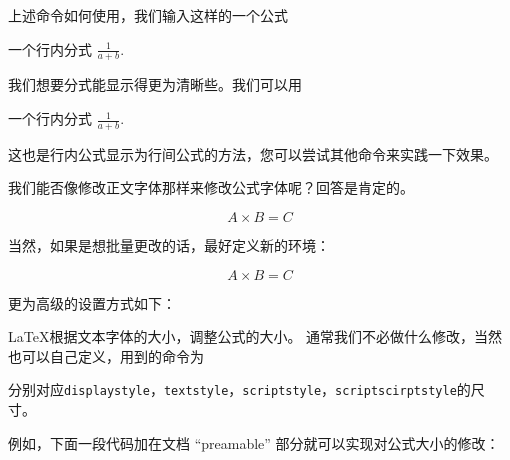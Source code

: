 \jiejue

上述命令如何使用，我们输入这样的一个公式
\begin{example}
一个行内分式 $\frac{1}{a + b}$.
\end{example}
\noindent 我们想要分式能显示得更为清晰些。我们可以用
\begin{example}
一个行内分式 $\displaystyle\frac{1}{a + b}$.
\end{example}
\noindent 这也是行内公式显示为行间公式的方法，您可以尝试其他命令来实践一下效果。


我们能否像修改正文字体那样来修改公式字体呢？回答是肯定的。

\begin{example}
\begin{small}
\begin{equation}
	A \times B = C
\end{equation}
\end{small}
\end{example}

当然，如果是想批量更改的话，最好定义新的环境：
\begin{latexcode}
\newenvironment{sequation}{\small\begin{equation}}{\end{equation}}
\newenvironment{tequation}{\tiny\begin{equation}}{\end{equation}}
\end{latexcode}
\newenvironment{sequation}{\small\begin{equation}}{\end{equation}}
\newenvironment{tequation}{\tiny\begin{equation}}{\end{equation}}
\begin{example}
\begin{tequation}
	A \times B = C
\end{tequation}
\end{example}

\jieshi

更为高级的设置方式如下：

\LaTeX{}根据文本字体的大小，调整公式的大小。
通常我们不必做什么修改，当然也可以自己定义，用到的命令为 
\begin{latexcode}
\end{latexcode}
\noindent 分别对应\verb|displaystyle|，\verb|textstyle|，\verb|scriptstyle|，\verb|scriptscirptstyle|的尺寸。


例如，下面一段代码加在文档 ``preamable'' 部分就可以实现对公式大小的修改：

